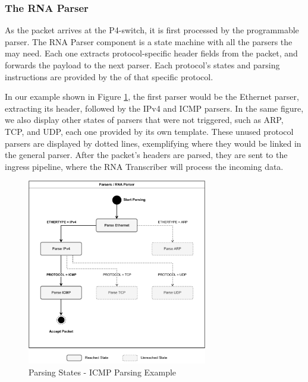 \subsubsection*{The RNA Parser}

As the packet arrives at the P4-switch, it is first processed by the programmable parser. The RNA Parser component is a state machine with all the parsers the \Offloaders{} may need. Each one extracts protocol-specific header fields from the packet, and forwards the payload to the next parser. Each protocol's states and parsing instructions are provided by the \ProtocolTemplate{} of that specific protocol.

In our example shown in Figure \ref{fig:icmp_ex_parser}, the first parser would be the Ethernet parser, extracting its header, followed by the IPv4 and ICMP parsers. In the same figure, we also display other states of parsers that were not triggered, such as ARP, TCP, and UDP, each one provided by its own template. These unused protocol parsers are displayed by dotted lines, exemplifying where they would be linked in the general parser. After the packet's headers are parsed, they are sent to the ingress pipeline, where the RNA Transcriber will process the incoming data.

\begin{figure}[ht]
    \caption{Parsing States - ICMP Parsing Example}
    \begin{center}
        \includegraphics[width=0.7\textwidth]{images/icmp_ex_parser.pdf}  
    \end{center}
    \label{fig:icmp_ex_parser}
\end{figure}

